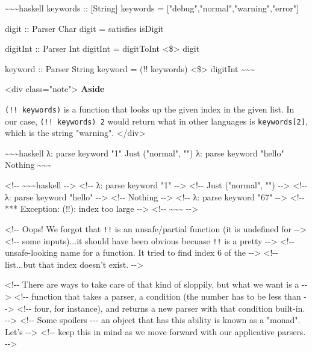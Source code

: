 \documentclass[]{article}
\begin{document}
\textasciitilde{}\textasciitilde{}\textasciitilde{}haskell keywords ::
{[}String{]} keywords = {[}"debug","normal","warning","error"{]}

digit :: Parser Char digit = satisfies isDigit

digitInt :: Parser Int digitInt = digitToInt \textless{}\$\textgreater{} digit

keyword :: Parser String keyword = (!! keywords) \textless{}\$\textgreater{}
digitInt \textasciitilde{}\textasciitilde{}\textasciitilde{}

\textless{}div class="note"\textgreater{} \textbf{Aside}

\texttt{(!!\ keywords)} is a function that looks up the given index in the given
list. In our case, \texttt{(!!\ keywords)\ 2} would return what in other
languages is \texttt{keywords{[}2{]}}, which is the string "warning".
\textless{}/div\textgreater{}

\textasciitilde{}\textasciitilde{}\textasciitilde{}haskell λ: parse keyword "1"
Just ("normal", "") λ: parse keyword "hello" Nothing
\textasciitilde{}\textasciitilde{}\textasciitilde{}

\textless{}!-\/- \textasciitilde{}\textasciitilde{}\textasciitilde{}haskell
-\/-\textgreater{} \textless{}!-\/- λ: parse keyword "1" -\/-\textgreater{}
\textless{}!-\/- Just ("normal", "") -\/-\textgreater{} \textless{}!-\/- λ:
parse keyword "hello" -\/-\textgreater{} \textless{}!-\/- Nothing
-\/-\textgreater{} \textless{}!-\/- λ: parse keyword "67" -\/-\textgreater{}
\textless{}!-\/- *** Exception: (!!): index too large -\/-\textgreater{}
\textless{}!-\/- \textasciitilde{}\textasciitilde{}\textasciitilde{}
-\/-\textgreater{}

\textless{}!-\/- Oops! We forgot that \texttt{!!} is an unsafe/partial function
(it is undefined for -\/-\textgreater{} \textless{}!-\/- some inputs)...it
should have been obvious becuase \texttt{!!} is a pretty -\/-\textgreater{}
\textless{}!-\/- unsafe-looking name for a function. It tried to find index 6 of
the -\/-\textgreater{} \textless{}!-\/- list...but that index doesn't exist.
-\/-\textgreater{}

\textless{}!-\/- There are ways to take care of that kind of sloppily, but what
we want is a -\/-\textgreater{} \textless{}!-\/- function that takes a parser, a
condition (the number has to be less than -\/-\textgreater{} \textless{}!-\/-
four, for instance), and returns a new parser with that condition built-in.
-\/-\textgreater{} \textless{}!-\/- Some spoilers -\/-\/- an object that has
this ability is known as a "monad". Let's -\/-\textgreater{} \textless{}!-\/-
keep this in mind as we move forward with our applicative parsers.
-\/-\textgreater{}
\end{document}
